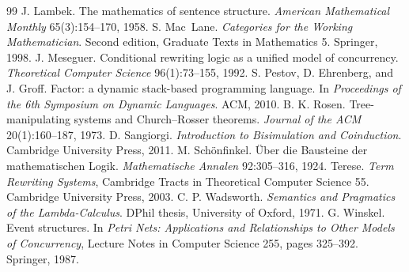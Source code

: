 \documentclass[11pt]{article}
\theoremstyle{definition}
\theoremstyle{remark}
\begin{document}
\begin{thebibliography}{99}
 J. Lambek. The mathematics of sentence structure. \emph{American Mathematical Monthly} 65(3):154--170, 1958.
 S. Mac~Lane. \emph{Categories for the Working Mathematician}. Second edition, Graduate Texts in Mathematics 5. Springer, 1998.
 J. Meseguer. Conditional rewriting logic as a unified model of concurrency. \emph{Theoretical Computer Science} 96(1):73--155, 1992.
 S. Pestov, D. Ehrenberg, and J. Groff. Factor: a dynamic stack-based programming language. In \emph{Proceedings of the 6th Symposium on Dynamic Languages}. ACM, 2010.
 B. K. Rosen. Tree-manipulating systems and Church--Rosser theorems. \emph{Journal of the ACM} 20(1):160--187, 1973.
 D. Sangiorgi. \emph{Introduction to Bisimulation and Coinduction}. Cambridge University Press, 2011.
 M. Sch{\"o}nfinkel. {\"U}ber die Bausteine der mathematischen Logik. \emph{Mathematische Annalen} 92:305--316, 1924.
 Terese. \emph{Term Rewriting Systems}, Cambridge Tracts in Theoretical Computer Science 55. Cambridge University Press, 2003.
 C. P. Wadsworth. \emph{Semantics and Pragmatics of the Lambda-Calculus}. DPhil thesis, University of Oxford, 1971.
 G. Winskel. Event structures. In \emph{Petri Nets: Applications and Relationships to Other Models of Concurrency}, Lecture Notes in Computer Science 255, pages 325--392. Springer, 1987.
\end{thebibliography}
\end{document}
